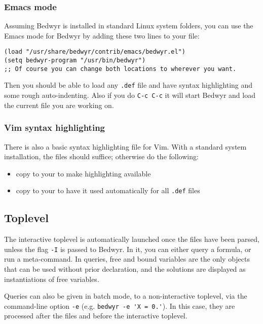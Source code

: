 \subsubsection{Emacs mode}

Assuming Bedwyr is installed in standard Linux system folders, you can
use the Emacs mode for Bedwyr by adding these two lines to your
 file:
\begin{verbatim}
(load "/usr/share/bedwyr/contrib/emacs/bedwyr.el")
(setq bedwyr-program "/usr/bin/bedwyr")
;; Of course you can change both locations to wherever you want.
\end{verbatim}

Then you should be able to load any \verb:.def: file and have syntax
highlighting and some rough auto-indenting.  Also if you do
\verb.C-c C-c. it will start Bedwyr and load the current file you are
working on.

\subsubsection{Vim syntax highlighting}

There is also a basic syntax highlighting file for Vim. With a standard
system installation, the files
 should
suffice; otherwise do the following:
\begin{itemize}
  \item copy  to your
     to make highlighting available
  \item copy  to your
     to have it used automatically for all
    \verb|.def| files
\end{itemize}

\subsection{Toplevel}

The interactive toplevel is automatically launched once the files have
been parsed, unless the flag \verb.-I. is passed to Bedwyr.  In it, you
can either query a formula, or run a meta-command.  In queries, free and
bound variables are the only objects that can be used without prior
declaration, and the solutions are displayed as instantiations of free
variables.

Queries can also be given in batch mode, to a non-interactive toplevel,
via the command-line option \verb.-e. (e.g.  \verb|bedwyr -e 'X = 0.'|).
In this case, they are processed after the files and before the
interactive toplevel.

